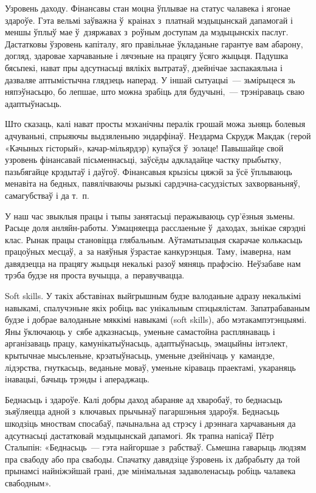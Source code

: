 Узровень даходу. Фінансавы стан моцна ўплывае на статус чалавека і ягонае здароўе. Гэта вельмі заўважна ў~краінах з~платнай мэдыцынскай дапамогай і меншы ўплыў мае ў~дзяржавах з~роўным доступам да мэдыцынскіх паслуг. Дастатковы ўзровень капіталу, яго правільнае ўкладаньне гарантуе вам абарону, догляд, здаровае харчаваньне і лячэньне на працягу ўсяго жыцьця. Падушка бясьпекі, нават пры адсутнасьці вялікіх вытратаў, дзейнічае заспакаяльна і дазваляе аптымістычна глядзець наперад. У іншай сытуацыі~--- зьмірыцеся зь няпэўнасьцю, бо лепшае, што можна зрабіць для будучыні,~--- трэніраваць сваю адаптыўнасьць.

Што сказаць, калі нават просты мэханічны пералік грошай можа зьняць болевыя адчуваньні, спрыяючы выдзяленьню эндарфінаў. Нездарма Скрудж Макдак (герой «Качыных гісторый», качар-мільярдэр) купаўся ў~золаце! Павышайце свой узровень фінансавай пісьменнасьці, заўсёды адкладайце частку прыбытку, пазьбягайце крэдытаў і даўгоў. Фінансавыя крызісы цяжэй за ўсё ўплываюць менавіта на бедных, павялічваючы рызыкі сардэчна-сасудзістых захворваньняў, самагубстваў і да т.~п.

У наш час звыклыя працы і тыпы занятасьці перажываюць сур'ёзныя зьмены. Расьце доля анляйн-работы. Узмацняецца расслаеньне ў~даходах, зьнікае сярэдні клас. Рынак працы становіцца глябальным. Аўтаматызацыя скарачае колькасьць працоўных месцаў, а~за наяўныя ўзрастае канкурэнцыя. Таму, імаверна, нам давядзецца на працягу жыцьця некалькі разоў мяняць прафэсію. Неўзабаве нам трэба будзе ня проста вучыцца, а~перавучвацца.

Soft skills. У такіх абставінах выйгрышным будзе валоданьне адразу некалькімі навыкамі, спалучэньне якіх робіць вас унікальным спэцыялістам. Запатрабаваным будзе і добрае валоданьне мяккімі навыкамі (soft skills), або мэтакампэтэнцыямі. Яны ўключаюць у~сябе адказнасьць, уменьне самастойна расплянаваць і арганізаваць працу, камунікатыўнасьць, адаптыўнасьць, эмацыйны інтэлект, крытычнае мысьленьне, крэатыўнасьць, уменьне дзейнічаць у~камандзе, лідэрства, гнуткасьць, веданьне моваў, уменьне кіраваць праектамі, укараняць інавацыі, бачыць трэнды і апераджаць.

Беднасьць і здароўе. Калі добры даход абараняе ад хваробаў, то беднасьць зьяўляецца адной з~ключавых прычынаў пагаршэньня здароўя. Беднасьць шкодзіць мноствам спосабаў, пачынальна ад стрэсу і дрэннага харчаваньня да адсутнасьці дастатковай мэдыцынскай дапамогі. Як трапна напісаў Пётр Сталыпін: «Беднасьць~--- гэта найгоршае з~рабстваў. Сьмешна гаварыць людзям пра свабоду або пра свабоды. Спачатку давядзіце ўзровень іх дабрабыту да той прынамсі найніжэйшай грані, дзе мінімальная задаволенасьць робіць чалавека свабодным».

